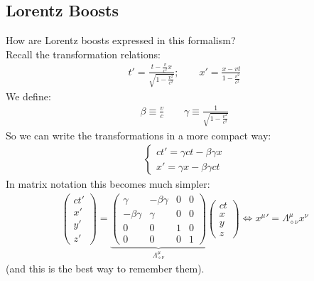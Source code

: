 \documentclass[../template.tex]{subfiles}
\begin{document}
\subsection{Lorentz Boosts}
How are Lorentz boosts expressed in this formalism?\\
Recall the transformation relations:
\begin{align*}
t' = \frac{t-\frac{v}{c^2}x}{\sqrt{1-\frac{v^2}{c^2}}}; \qquad x'=\frac{x-vt}{1-\frac{v^2}{c^2}}
\end{align*}
We define:
\begin{align*}
\beta \equiv \frac{v}{c}\qquad \gamma \equiv \frac{1}{\sqrt{1-\frac{v^2}{c^2}}}
\end{align*}
So we can write the transformations in a more compact way:
\begin{align*}
\begin{cases}
ct' = \gamma ct - \beta\gamma x\\
x' = \gamma x -\beta\gamma ct
\end{cases}
\end{align*}
In matrix notation this becomes much simpler:
\begin{align*}
\begin{pmatrix}ct'\\ x'\\y'\\z'\end{pmatrix} = 
\underbrace{\begin{pmatrix}\gamma & -\beta\gamma & 0 & 0\\
-\beta\gamma & \gamma & 0 & 0\\
0 & 0 & 1 & 0\\
0 & 0 & 0 & 1\end{pmatrix}}_{\Lambda^\mu_{\diamond \nu}}
\begin{pmatrix}ct\\x\\y\\z\end{pmatrix}
\Leftrightarrow {x^{\mu}}' = \Lambda^\mu_{\diamond \nu} x^\nu
\end{align*}
(and this is the best way to remember them).\\
\end{document}
